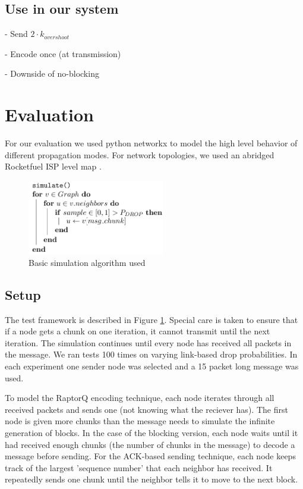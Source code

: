 \subsection{Use in our system}
-   Send  $2\cdot k_{overshoot}$

-   Encode once (at transmission)

-   Downside of no-blocking


\section{Evaluation}
For our evaluation we used python networkx to model the high level behavior of different propagation modes\cite{nwx}. 
For network topologies, we used an abridged Rocketfuel ISP level map \cite{rocketfuel}.

\begin{figure}[tp]
\centering
\includegraphics[width=6cm]{figures/simulate_algo.png}
\caption{Basic simulation algorithm used}
\label{algo:a1}
\end{figure}

\subsection{Setup}
The test framework is described in Figure \ref{algo:a1}. Special care is taken to ensure that if a node gets a chunk on one iteration, it cannot transmit until the next iteration. The simulation continues until every node has received all packets in the message. We ran tests 100 times on varying link-based drop probabilities. In each experiment one sender node was selected and a 15 packet long message was used. 

To model the RaptorQ encoding technique, each node iterates through all received packets and sends one (not knowing what the reciever has). The first node is given more chunks than the message needs to simulate the infinite generation of blocks. In the case of the blocking version, each node waits until it had received enough chunks (the number of chunks in the message) to decode a message before sending. For the ACK-based sending technique, each node keeps track of the largest 'sequence number' that each neighbor has received. It repeatedly sends one chunk until the neighbor tells it to move to the next block.

